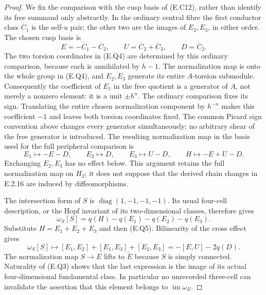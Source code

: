 \begin{proof}
We fix the comparison with the cusp basis of (E.C12), rather
than identify its free summand only abstractly.  In the ordinary
central fibre the first conductor class $\overline C_1$ is the
self-$u$ pair; the other two are the images of $E_2,E_3$,
in either order.  The chosen cusp basis is
\[
 E=-\overline C_1-\overline C_2,\qquad
 U=\overline C_2+\overline C_3,\qquad D=\overline C_2.
\]
The two torsion coordinates in (E.Q4) are determined by
this ordinary comparison, because each is annihilated by
$h-1$.  The normalization map is onto the whole group in
(E.Q4), and $E_2,E_3$ generate its entire $A$-torsion
submodule.  Consequently the coefficient of $E_1$ in the
free quotient is a generator of $A$, not merely a nonzero
element: it is a unit $\pm h^n$.  The ordinary comparison
fixes its sign.  Translating the entire chosen normalization
component by $h^{-n}$ makes this coefficient $-1$ and leaves
both torsion coordinates fixed.  The common Picard sign
convention above changes every generator simultaneously;
no arbitrary shear of the free generator is introduced.
The resulting
normalization map in the basis used for the full peripheral
comparison is
\[
 E_1\longmapsto-E-D,\qquad
 E_2\longmapsto D,\qquad E_3\longmapsto U-D,
 \qquad H\longmapsto-E+U-D.
 \tag{E.Q5}
\]
Exchanging $E_2,E_3$ has no effect below.  This argument
retains the full normalization map on $H_2$; it does not
suppose that the derived chain changes in E.2.16 are induced
by diffeomorphisms.

The intersection form of $S$ is
$\operatorname{diag}(1,-1,-1,-1)$.  Its usual four-cell
description, or the Hopf invariant of its two-dimensional
classes, therefore gives
\[
 \omega_S[S]=q(H)-q(E_1)-q(E_2)-q(E_3).
\]
Substitute $H=E_1+E_2+E_3$ and then (E.Q5).  Bilinearity
of the cross effect gives
\[
 \omega_S[S]\longmapsto
 [E_1,E_2]+[E_1,E_3]+[E_2,E_3]
                      =-[E,U]-2q(D).
 \tag{E.Q6}
\]
The normalization map $S\to E$ lifts to $\widetilde E$
because $S$ is simply connected.  Naturality of (E.Q3)
shows that the last expression is the image of its actual
four-dimensional fundamental class.  In particular no
unrecorded three-cell can invalidate the assertion that
this element belongs to $\operatorname{im}\omega_E$.


\end{proof}
